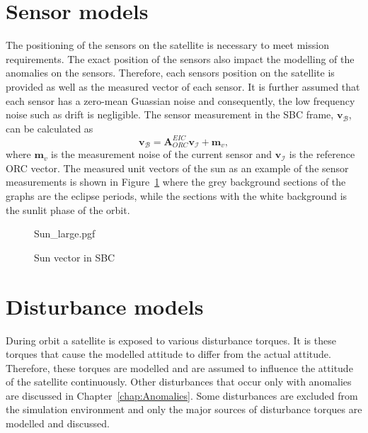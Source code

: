 \section{Sensor models}
The positioning of the sensors on the satellite is necessary to meet mission requirements. The exact position of the sensors also impact the modelling of the anomalies on the sensors. Therefore, each sensors position on the satellite is provided as well as the measured vector of each sensor. It is further assumed that each sensor has a zero-mean Guassian noise and consequently, the low frequency noise such as drift is negligible. The sensor measurement in the SBC frame, $\mathbf{v}_{\mathcal{B}}$,  can be calculated as
\begin{equation}
\mathbf{v}_{\mathcal{B}} = \mathbf{A}_{ORC}^{EIC} \mathbf{v}_{\mathcal{I}} + \mathbf{m}_v,
\end{equation}
where $\mathbf{m}_v$ is the measurement noise of the current sensor and $\mathbf{v}_{\mathcal{I}}$ is the reference ORC vector. The measured unit vectors of the sun as an example of the sensor measurements is shown in Figure~\ref{fig:SunSensorPlot} where the grey background sections of the graphs are the eclipse periods, while the sections with the white background is the sunlit phase of the orbit.

\begin{figure}[!htb]
	\centering
	\def\pgfwidth{7cm}
	{Sun_large.pgf}
	
	\caption{Sun vector in SBC}
	\label{fig:SunSensorPlot}
\end{figure}

%	
%
%	

\section{Disturbance models}
\label{section: disturbance models}
During orbit a satellite is exposed to various disturbance torques. It is these torques that cause the modelled attitude to differ from the actual attitude. Therefore, these torques are modelled and are assumed to influence the attitude of the satellite continuously. Other disturbances that occur only with anomalies are discussed in Chapter~\ref{chap:Anomalies}. Some disturbances are excluded from the simulation environment and only the major sources of disturbance torques are modelled and discussed.

